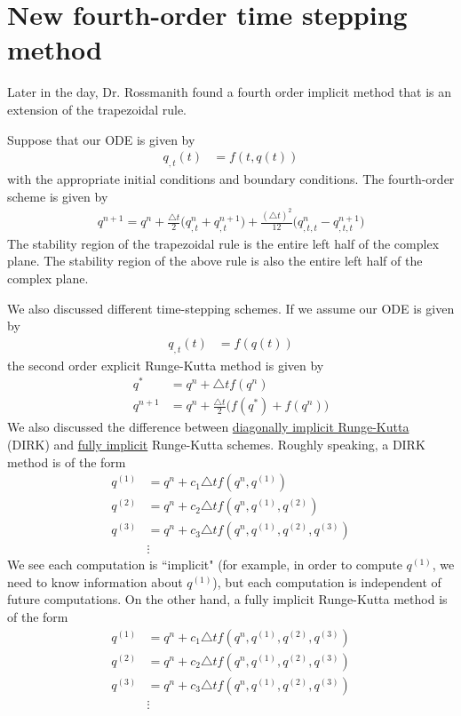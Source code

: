 \section*{New fourth-order time stepping method}
Later in the day, Dr. Rossmanith found a fourth order implicit method that is an extension of the trapezoidal rule. 
\par 
Suppose that our ODE is given by
\begin{align*}
	q_{, t}(t) & = f(t, q(t))
\end{align*}
with the appropriate initial conditions and boundary conditions.
The fourth-order scheme is given by
\begin{align*}
	q^{n+1} = q^{n} + \frac{\triangle t}{2} \Bigg( q_{, t}^{n} + q_{, t}^{n + 1} \Bigg)
					+ \frac{(\triangle t)^{2}}{12} \Bigg( q_{, t, t}^{n} - q_{, t, t}^{n + 1} \Bigg)
\end{align*}
The stability region of the trapezoidal rule is the entire left half of the complex plane.
The stability region of the above rule is also the entire left half of the complex plane.
\par 
We also discussed different time-stepping schemes.
If we assume our ODE is given by
\begin{align*}
	q_{, t}(t) & = f(q(t))
\end{align*}
the second order explicit Runge-Kutta method is given by 
\begin{align*}
	q^{*} & = q^{n} + \triangle t f(q^{n}) \\
	q^{n+1} & = q^{n} + \frac{\triangle t}{2} \Big( f(q^{*}) + f(q^{n}) \Big) 
\end{align*}
We also discussed the difference between \underline{diagonally implicit Runge-Kutta} (DIRK) and \underline{fully implicit} Runge-Kutta schemes.
Roughly speaking, a DIRK method is of the form
\begin{align*}
	q^{(1)} & = q^{n} + c_{1} \triangle t f(q^{n}, q^{(1)}) \\
	q^{(2)} & = q^{n} + c_{2} \triangle t f(q^{n}, q^{(1)}, q^{(2)}) \\
	q^{(3)} & = q^{n} + c_{3} \triangle t f(q^{n}, q^{(1)}, q^{(2)}, q^{(3)}) \\
	        & \vdots 
\end{align*}
We see each computation is ``implicit" (for example, in order to compute $q^{(1)}$, we need to know information about $q^{(1)}$), but each computation is independent of future computations.
On the other hand, a fully implicit Runge-Kutta method is of the form
\begin{align*}
	q^{(1)} & = q^{n} + c_{1} \triangle t f(q^{n}, q^{(1)}, q^{(2)}, q^{(3)}) \\
	q^{(2)} & = q^{n} + c_{2} \triangle t f(q^{n}, q^{(1)}, q^{(2)}, q^{(3)}) \\
	q^{(3)} & = q^{n} + c_{3} \triangle t f(q^{n}, q^{(1)}, q^{(2)}, q^{(3)}) \\
	        & \vdots
\end{align*}
